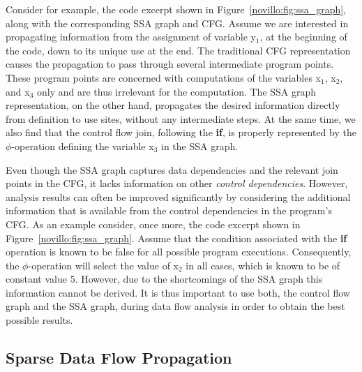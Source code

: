Consider for example, the code excerpt shown in
Figure~\ref{novillo:fig:ssa_graph}, along with the corresponding SSA graph and
CFG. Assume we are interested in propagating information from the assignment of
variable y$_1$, at the beginning of the code, down to its unique use at
the end. The traditional CFG representation causes the propagation
to pass through several intermediate program points. These program points are
concerned with computations of the variables x$_1$, x$_2$, and x$_3$ only and
are thus irrelevant for the computation. The SSA graph representation, on
the other hand, propagates the desired information directly from definition to
use sites, without
any intermediate steps. At the same time, we also find that the control flow
join, following the \textbf{if}, is properly represented by the $\phi$-operation
defining the variable x$_3$ in the SSA graph.

Even though the SSA graph captures data dependencies and the relevant join
points in the CFG, it lacks information on other
\emph{control dependencies}. However, analysis results can often be improved
significantly by considering the additional information that is available from
the control dependencies in the program's CFG. As an example consider, once more,
the code excerpt shown in Figure~\ref{novillo:fig:ssa_graph}. Assume that the
condition associated with the \textbf{if} operation is known to be false for all
possible program executions. Consequently, the $\phi$-operation will select the
value of x$_2$ in all cases, which is known to be of constant value $5$.
However, due to the shortcomings of the SSA graph this information cannot be
derived. It is thus important to use both, the control flow graph and the SSA
graph, during data flow analysis in order to obtain the best possible results.

\subsection{Sparse Data Flow Propagation}

